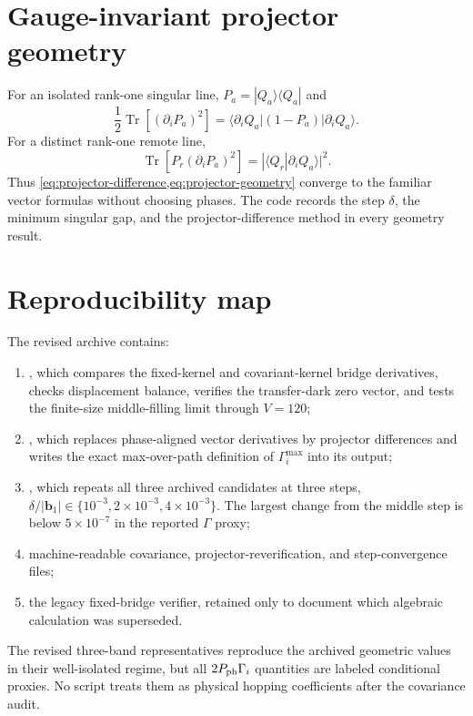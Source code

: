\documentclass[11pt]{article}
\theoremstyle{remark}
\newcommand{\Tr}{\operatorname{Tr}}
\begin{document}
\section{Gauge-invariant projector geometry}
\label{app:projector-geometry}

For an isolated rank-one singular line, $P_a=|Q_a\rangle\langle Q_a|$ and
\begin{equation}
\frac12\Tr[(\partial_iP_a)^2]
=\langle\partial_iQ_a|(1-P_a)|\partial_iQ_a\rangle.
\end{equation}
For a distinct rank-one remote line,
\begin{equation}
\Tr[P_r(\partial_iP_a)^2]
=|\langle Q_r|\partial_iQ_a\rangle|^2.
\end{equation}
Thus \cref{eq:projector-difference,eq:projector-geometry} converge to the familiar vector formulas without choosing phases.  The code records the step $\delta$, the minimum singular gap, and the projector-difference method in every geometry result.

\section{Reproducibility map}
\label{app:reproducibility}

The revised archive contains:
\begin{enumerate}
\item {}, which compares the fixed-kernel and covariant-kernel bridge derivatives, checks displacement balance, verifies the transfer-dark zero vector, and tests the finite-size middle-filling limit through $V=120$;
\item {}, which replaces phase-aligned vector derivatives by projector differences and writes the exact max-over-path definition of $\Gamma_i^{\max}$ into its output;
\item {}, which repeats all three archived candidates at three steps,
$\delta/|\bm b_1|\in\{10^{-3},2\times10^{-3},4\times10^{-3}\}$.  The largest change from the middle step is below $5\times10^{-7}$ in the reported $\Gamma$ proxy;
\item machine-readable covariance, projector-reverification, and step-convergence files;
\item the legacy fixed-bridge verifier, retained only to document which algebraic calculation was superseded.
\end{enumerate}
The revised three-band representatives reproduce the archived geometric values in their well-isolated regime, but all $2P_{\rm ph}\Gamma_i$ quantities are labeled conditional proxies.  No script treats them as physical hopping coefficients after the covariance audit.
\end{document}
